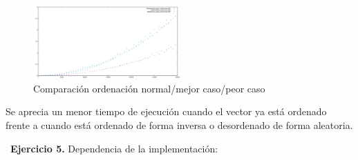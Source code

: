 \documentclass[titlepage, 12pt,a4paper]{article}
\begin{document}
\begin{figure}[!ht]
  \caption{Comparación ordenación normal/mejor caso/peor caso}
  \centering
    \includegraphics[width=0.5\textwidth]{./img/ef_pract_ej_4.png}
\end{figure}  

Se aprecia un menor tiempo de ejecución cuando el vector ya está ordenado frente a cuando está ordenado de forma inversa o desordenado de forma aleatoria.
\newpage

\ 
  \textbf{\large Ejercicio 5.} Dependencia de la implementación:\\ 
  
\end{document}
